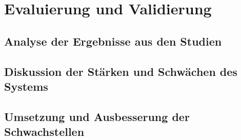 \section{Evaluierung und Validierung}



\subsection{Analyse der Ergebnisse aus den Studien}

\subsection{Diskussion der Stärken und Schwächen des Systems}

\subsection{Umsetzung und Ausbesserung der Schwachstellen}